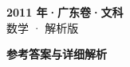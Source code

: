 \documentclass[zihao=-4, a4paper]{ctexart}
\begin{document}
\begin{center}
  {\Large\bfseries 2011 年·广东卷·文科}\\[4pt]
  {\large 数学 · 解析版}
\end{center}
\medskip
{}

\clearpage
{}
\begin{center}{\Large\bfseries 参考答案与详细解析}\end{center}
\medskip

\end{document}
